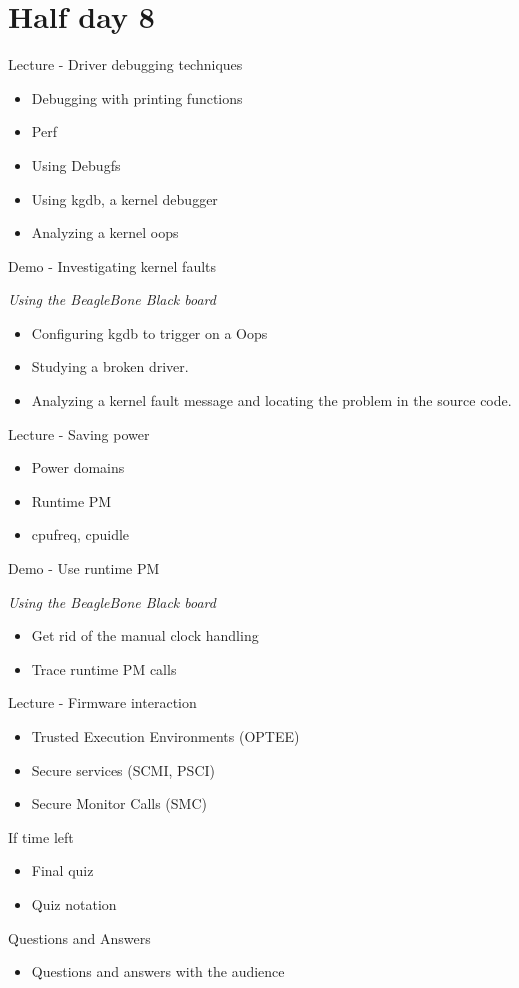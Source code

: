 \documentclass[a4paper,12pt,obeyspaces,spaces,hyphens]{article}
\begin{document}
\section{Half day 8}
\feagendatwocolumn
{Lecture - Driver debugging techniques}
{
  \begin{itemize}
  \item Debugging with printing functions
  \item Perf
  \item Using Debugfs
  \item Using kgdb, a kernel debugger
  \item Analyzing a kernel oops
  \end{itemize}
}
{Demo - Investigating kernel faults}
{
  {\em Using the BeagleBone Black board}
  \begin{itemize}
  \item Configuring kgdb to trigger on a Oops
  \item Studying a broken driver.
  \item Analyzing a kernel fault message and locating the problem in the
    source code.
  \end{itemize}
}

\feagendatwocolumn
{Lecture - Saving power}
{
  \begin{itemize}
  \item Power domains
  \item Runtime PM
  \item cpufreq, cpuidle
  \end{itemize}
}
{Demo - Use runtime PM}
{
  {\em Using the BeagleBone Black board}
  \begin{itemize}
  \item Get rid of the manual clock handling
  \item Trace runtime PM calls
  \end{itemize}
}

\feagendaonecolumn
{Lecture - Firmware interaction}
{
  \begin{itemize}
  \item Trusted Execution Environments (OPTEE)
  \item Secure services (SCMI, PSCI)
  \item Secure Monitor Calls (SMC)
  \end{itemize}
}

\feagendatwocolumn
{If time left}
{
  \begin{itemize}
  \item Final quiz
  \item Quiz notation
  \end{itemize}
}
{Questions and Answers}
{
  \begin{itemize}
  \item Questions and answers with the audience
  \end{itemize}
}
\end{document}
